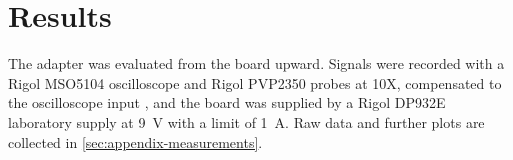 
\chapter{Results}
\label{ch:results}

The adapter was evaluated from the board upward. Signals were recorded with a Rigol MSO5104 oscilloscope and Rigol PVP2350 probes at 10X, compensated to the oscilloscope input \cite{tektronix2026probes}, and the board was supplied by a Rigol DP932E laboratory supply at \qty{9}{\volt} with a limit of \qty{1}{\ampere}. Raw data and further plots are collected in \cref{sec:appendix-measurements}.





